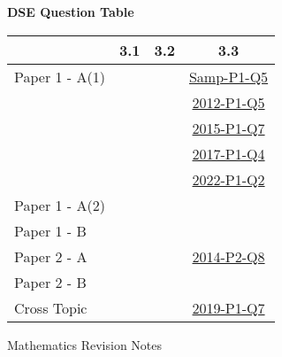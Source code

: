 \documentclass[12pt, a4paper]{article}
\begin{document}
\begin{absolutelynopagebreak}
\begin{center}
\textbf{DSE Question Table}
\end{center}
\begin{center}
\begin{tabular}{|l|c|c|c|}
\hline
        & 3.1 & 3.2 & 3.3 \\\hline
\hline
Paper 1 - A(1)&  &  & \hyperref[DSE2012S-CoreP1-Q05]{Samp-P1-Q5} \\
&  &  & \hyperref[DSE2012-CoreP1-Q05]{2012-P1-Q5} \\
&  &  & \hyperref[DSE2015-CoreP1-Q07]{2015-P1-Q7} \\
&  &  & \hyperref[DSE2017-CoreP1-Q04]{2017-P1-Q4} \\
&  &  & \hyperref[DSE2022-CoreP1-Q02]{2022-P1-Q2} \\
\hline
Paper 1 - A(2)&  &  &  \\
\hline
Paper 1 - B&  &  &  \\
\hline
\hline
Paper 2 - A&  &  & \hyperref[DSE2014-CoreP2-Q08]{2014-P2-Q8} \\
\hline
Paper 2 - B&  &  &  \\
\hline
\hline
Cross Topic&  &  & \hyperref[DSE2019-CoreP1-Q07]{2019-P1-Q7} \\
\hline
\end{tabular}
\end{center}
\end{absolutelynopagebreak}
\newpage
\newpage
\thispagestyle{empty}
\begin{center}
Mathematics Revision Notes\\\vspace{1cm}
\\\vspace{1cm}
{\fontsize{24pt}{24pt}\selectfont {Percentages (I)}} \\\vspace{1cm}
\label{chapter:S1-4}

\end{center}
\vspace{0.5cm}
\hline
\end{document}
